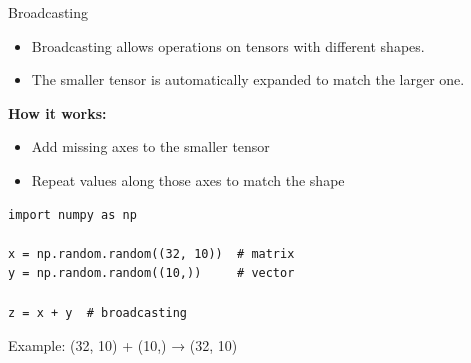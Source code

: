 \documentclass{beamer}
\begin{document}
\begin{frame}[fragile]{Broadcasting}
    \begin{itemize}
        \item Broadcasting allows operations on tensors with different shapes.
        \item The smaller tensor is automatically expanded to match the larger one.
    \end{itemize}

    \vspace{0.3em}
    \textbf{How it works:}
    \begin{itemize}
        \item Add missing axes to the smaller tensor
        \item Repeat values along those axes to match the shape
    \end{itemize}

    \begin{center}
        \begin{tcolorbox}[
                width=0.75\textwidth,
                colback=gray!5,
                colframe=gray!60,
                boxrule=0.4pt,
                arc=3pt,
                left=6pt,right=6pt,top=6pt,bottom=6pt
            ]
            \begin{verbatim}
import numpy as np

x = np.random.random((32, 10))  # matrix
y = np.random.random((10,))     # vector

z = x + y  # broadcasting
\end{verbatim}
        \end{tcolorbox}
    \end{center}

    \vspace{0.5em}
    \small Example: (32, 10) + (10,) → (32, 10)
\end{frame}
\end{document}
